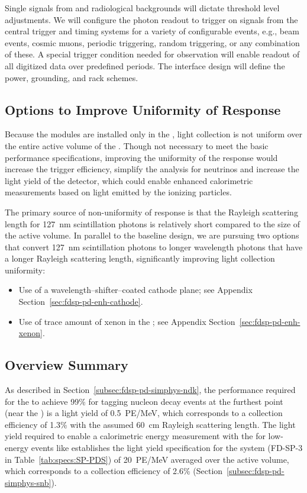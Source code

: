 Single \phel signals from  and radiological backgrounds will dictate threshold level adjustments.
We will configure the photon readout to trigger on signals from the central trigger and timing systems for a variety of configurable events, e.g., beam events, cosmic
muons, periodic triggering, random triggering, or any combination of
these. A special trigger condition needed for  observation will enable readout of all digitized data over predefined periods.
The interface design will define the power, grounding, and rack schemes.


\subsection{Options to Improve Uniformity of Response} 

Because the  modules are installed only in the , light collection is not uniform over the entire active volume of the . 
Though not necessary to meet the basic  performance specifications, improving the uniformity of the response would increase the trigger efficiency, simplify the analysis for  neutrinos and increase the light yield of the detector, which could enable enhanced calorimetric measurements based on light emitted by the ionizing particles.

The primary source of non-uniformity of response is that the Rayleigh scattering length for \SI{127}{nm} scintillation photons is relatively short compared to the size of the  active volume.   
In parallel to the baseline design, we are pursuing two options that convert \SI{127}{nm} scintillation photons to longer wavelength photons that have a longer Rayleigh scattering length, significantly improving light collection uniformity:
\begin{itemize}
\item Use of a wavelength--shifter--coated cathode plane; see Appendix Section~\ref{sec:fdsp-pd-enh-cathode}.
\item Use of trace amount of xenon in the ; see Appendix Section~\ref{sec:fdsp-pd-enh-xenon}.
\end{itemize}


\subsection{Overview Summary} 
\label{sec:fdsp-pd-ov-summ}

As described in Section~\ref{subsec:fdsp-pd-simphys-ndk}, the performance required for the  to achieve 99\% for tagging nucleon decay events at the furthest point (near the ) is a light yield of \SI{0.5}{PE/MeV}, which corresponds to a collection efficiency of 1.3\% with the assumed \SI{60}{cm} Rayleigh scattering length. The light yield required to enable a calorimetric energy measurement with the  for low-energy events like  establishes the light yield specification for the system (FD-SP-3 in Table~\ref{tab:specs:SP-PDS}) of \SI{20}{PE/MeV} averaged over the active volume, which corresponds to a collection efficiency of 2.6\% (Section~\ref{subsec:fdsp-pd-simphys-snb}).

